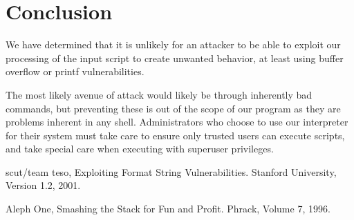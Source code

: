 \documentclass[12pt]{article}
\begin{document}
\section{Conclusion}
We have determined that it is unlikely for an attacker to be able to exploit our processing of the input script to create unwanted behavior, at least using buffer overflow or printf vulnerabilities.

The most likely avenue of attack would likely be through inherently bad commands, but preventing these is out of the scope of our program as they are problems inherent in any shell. Administrators who choose to use our interpreter for their system must take care to ensure only trusted users can execute scripts, and take special care when executing with superuser privileges.

\begin{thebibliography}{9}

	scut/team teso,
	Exploiting Format String Vulnerabilities.
	Stanford University,
	Version 1.2,
	2001.

	Aleph One,
	Smashing the Stack for Fun and Profit.
	Phrack,
	Volume 7,
	1996.
\end{thebibliography}
\end{document}
